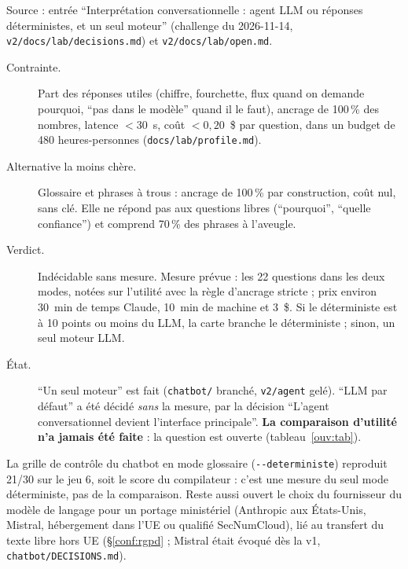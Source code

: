 Source : entrée \enquote{Interprétation conversationnelle : agent LLM ou réponses déterministes, et un seul moteur} (challenge du 2026-11-14, \texttt{v2/\allowbreak{}docs/\allowbreak{}lab/\allowbreak{}decisions.md}) et \texttt{v2/\allowbreak{}docs/\allowbreak{}lab/\allowbreak{}open.md}.

\begin{description}
\item[Contrainte.] Part des réponses utiles (chiffre, fourchette, flux quand on demande pourquoi, \enquote{pas dans le modèle} quand il le faut), ancrage de 100\suppose{}\,\% des nombres, latence $<30$\suppose{}~s, coût $<0{,}20$\suppose{}~\$ par question, dans un budget de 480\suppose{} heures-personnes (\texttt{docs/\allowbreak{}lab/\allowbreak{}profile.md}).
\item[Alternative la moins chère.] Glossaire et phrases à trous : ancrage de 100\derive{}\,\% par construction, coût nul, sans clé. Elle ne répond pas aux questions libres (\enquote{pourquoi}, \enquote{quelle confiance}) et comprend 70\mesure{}\,\% des phrases à l'aveugle.
\item[Verdict.] Indécidable sans mesure. Mesure prévue : les 22\mesure{} questions dans les deux modes, notées sur l'utilité avec la règle d'ancrage stricte ; prix environ 30\suppose{}~min de temps Claude, 10\suppose{}~min de machine et 3\suppose{}~\$. Si le déterministe est à 10\suppose{} points ou moins du LLM, la carte branche le déterministe ; sinon, un seul moteur LLM.
\item[État.] \enquote{Un seul moteur} est fait (\texttt{chatbot/\allowbreak{}} branché, \texttt{v2/\allowbreak{}agent} gelé). \enquote{LLM par défaut} a été décidé \emph{sans} la mesure, par la décision \enquote{L'agent conversationnel devient l'interface principale}. \textbf{La comparaison d'utilité n'a jamais été faite} : la question est ouverte (tableau~\ref{ouv:tab}).
\end{description}
La grille de contrôle du chatbot en mode glossaire (\texttt{-\allowbreak{}-\allowbreak{}deterministe}) reproduit 21/30\mesure{} sur le jeu 6, soit le score du compilateur : c'est une mesure du seul mode déterministe, pas de la comparaison.
Reste aussi ouvert le choix du fournisseur du modèle de langage pour un portage ministériel (Anthropic aux États-Unis, Mistral, hébergement dans l'UE ou qualifié SecNumCloud), lié au transfert du texte libre hors UE (§\ref{conf:rgpd} ; Mistral était évoqué dès la v1, \texttt{chatbot/\allowbreak{}DECISIONS.md}).

